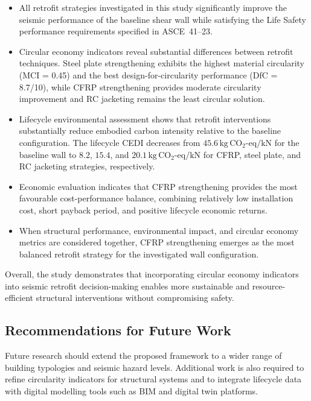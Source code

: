\documentclass[fleqn,10pt]{wlscirep}
\begin{document}
\begin{itemize}

\item All retrofit strategies investigated in this study significantly improve the
seismic performance of the baseline shear wall while satisfying the Life Safety
performance requirements specified in ASCE~41--23.

\item Circular economy indicators reveal substantial differences between retrofit
techniques. Steel plate strengthening exhibits the highest material circularity
(MCI = 0.45) and the best design-for-circularity performance (DfC = 8.7/10),
while CFRP strengthening provides moderate circularity improvement and RC
jacketing remains the least circular solution.

\item Lifecycle environmental assessment shows that retrofit interventions
substantially reduce embodied carbon intensity relative to the baseline
configuration. The lifecycle CEDI decreases from
$45.6\,\mathrm{kg\,CO_2\text{-}eq/kN}$ for the baseline wall to
$8.2$, $15.4$, and $20.1\,\mathrm{kg\,CO_2\text{-}eq/kN}$ for CFRP, steel plate,
and RC jacketing strategies, respectively.

\item Economic evaluation indicates that CFRP strengthening provides the most
favourable cost-performance balance, combining relatively low installation cost,
short payback period, and positive lifecycle economic returns.

\item When structural performance, environmental impact, and circular economy
metrics are considered together, CFRP strengthening emerges as the most balanced
retrofit strategy for the investigated wall configuration.

\end{itemize}

Overall, the study demonstrates that incorporating circular economy indicators
into seismic retrofit decision-making enables more sustainable and resource-
efficient structural interventions without compromising safety.

\subsection*{Recommendations for Future Work}

Future research should extend the proposed framework to a wider range of building
typologies and seismic hazard levels. Additional work is also required to refine
circularity indicators for structural systems and to integrate lifecycle data with
digital modelling tools such as BIM and digital twin platforms.
\end{document}

